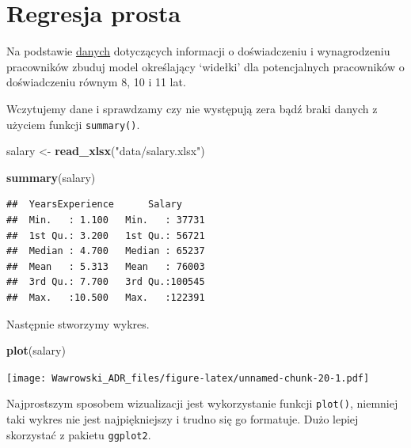 \documentclass[
]{book}
\newenvironment{Shaded}{\begin{snugshade}}{\end{snugshade}}
\newcommand{\KeywordTok}[1]{\textcolor[rgb]{0.13,0.29,0.53}{\textbf{#1}}}
\newcommand{\NormalTok}[1]{#1}
\newcommand{\StringTok}[1]{\textcolor[rgb]{0.31,0.60,0.02}{#1}}
\begin{document}
\hypertarget{regresja-prosta}{%
\section{Regresja prosta}\label{regresja-prosta}}

Na podstawie \href{data/salary.xlsx}{danych} dotyczących informacji o doświadczeniu i wynagrodzeniu pracowników zbuduj model określający `widełki' dla potencjalnych pracowników o doświadczeniu równym 8, 10 i 11 lat.

Wczytujemy dane i sprawdzamy czy nie występują zera bądź braki danych z użyciem funkcji \texttt{summary()}.

\begin{Shaded}
\begin{Highlighting}[]
\NormalTok{salary <-}\StringTok{ }\KeywordTok{read_xlsx}\NormalTok{(}\StringTok{"data/salary.xlsx"}\NormalTok{)}

\KeywordTok{summary}\NormalTok{(salary)}
\end{Highlighting}
\end{Shaded}

\begin{verbatim}
##  YearsExperience      Salary      
##  Min.   : 1.100   Min.   : 37731  
##  1st Qu.: 3.200   1st Qu.: 56721  
##  Median : 4.700   Median : 65237  
##  Mean   : 5.313   Mean   : 76003  
##  3rd Qu.: 7.700   3rd Qu.:100545  
##  Max.   :10.500   Max.   :122391
\end{verbatim}

Następnie stworzymy wykres.

\begin{Shaded}
\begin{Highlighting}[]
\KeywordTok{plot}\NormalTok{(salary)}
\end{Highlighting}
\end{Shaded}

\texttt{[image: Wawrowski\_ADR\_files/figure-latex/unnamed-chunk-20-1.pdf]}

Najprostszym sposobem wizualizacji jest wykorzystanie funkcji \texttt{plot()}, niemniej taki wykres nie jest najpiękniejszy i trudno się go formatuje. Dużo lepiej skorzystać z pakietu \texttt{ggplot2}.
\end{document}
